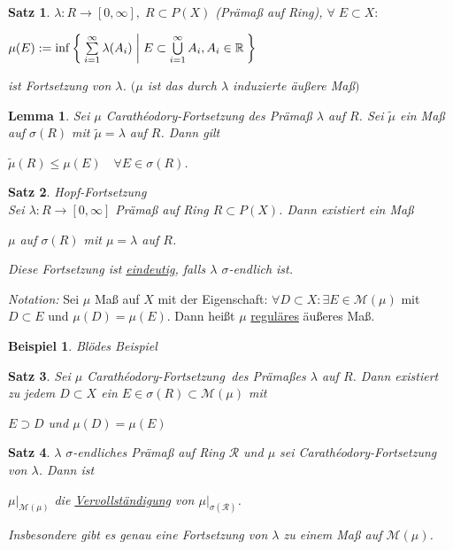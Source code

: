 \documentclass[11pt]{memoir}
\theoremstyle{changebreak}
\newtheorem{Beispiel}{Beispiel}[chapter]
\newtheorem{Lemma}{Lemma}[chapter]
\newtheorem{Satz}{Satz}[chapter]
\newcommand{\cara}{Carathéodory-Fortsetzung}
\begin{document}
\begin{Satz}
$\lambda: R \rightarrow [0, \infty], \;R \subset P(X)$ (Prämaß auf Ring), $\forall \;E \subset X:$ \\
\begin{center}
$\mu(E):= \inf\Set{ \sum\limits_{i=1}^{\infty} \lambda(A_i) | E \subset \bigcup\limits_{i=1}^{\infty} A_i, A_i \in \mathbb{R}}$
\end{center}
ist Fortsetzung von $\lambda$. $(\mu$ ist das durch $\lambda$ induzierte äußere Maß$)$
\end{Satz}

\begin{Lemma}
Sei $\mu$ \cara\; des Prämaß $\lambda$ auf $R$. Sei $\tilde{\mu}$ ein Maß auf $\sigma(R)$ mit $\tilde{\mu} = \lambda$ auf $R$. Dann gilt 
\begin{center}
	$\tilde{\mu}(R) \leq \mu(E)\quad \forall E \in \sigma(R)$.
\end{center}
\end{Lemma}

\begin{Satz} \emph{Hopf-Fortsetzung} \\
Sei $\lambda: R \rightarrow [0, \infty]$ Prämaß auf Ring $R \subset P(X)$. Dann existiert ein Maß 
\begin{center}
	$\mu$ auf $\sigma(R)$ mit $\mu =\lambda$ auf $R$.
\end{center}	
Diese Fortsetzung ist \underline{eindeutig}, falls $\lambda$ $\sigma$-endlich ist.
\end{Satz}

\emph{Notation:}
Sei $\mu$ Maß auf $X$ mit der Eigenschaft: $\forall D \subset X: \exists E \in \mathscr{M}(\mu)$ mit $D \subset E$ und $\mu(D) = \mu(E)$. Dann heißt $\mu$ \underline{reguläres} äußeres Maß.

\begin{Beispiel}
Blödes Beispiel
\end{Beispiel}

\begin{Satz}
Sei $\mu$ \cara\, des Prämaßes $\lambda$ auf $R$. Dann existiert zu jedem $D \subset X$ ein $E \in \sigma(R) \subset \mathscr M(\mu)$ mit 
\begin{center}
	$E \supset D$ \quad und \quad $\mu(D) = \mu(E)$
\end{center}
\end{Satz}

\begin{Satz}
$\lambda$  $\sigma$-endliches Prämaß auf Ring $\mathscr R$ und $\mu$ sei \cara\; von $\lambda$. Dann ist 
\begin{center}
	$\mu|_{\mathscr M(\mu)}$ die \underline{Vervollständigung} von $\mu|_{\sigma(\mathscr R)}$. 
\end{center}
Insbesondere gibt es genau eine Fortsetzung von $\lambda$ zu einem Maß auf $\mathscr M(\mu)$.
\end{Satz}
\end{document}
